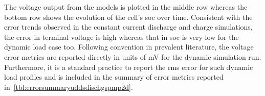 The  voltage  output from  the  models  is plotted  in  the  middle row  whereas
the  bottom  row  shows  the  evolution  of  the  cell's  \gls{soc}  over  time.
Consistent with the error trends observed  in the constant current discharge and
charge  simulations, the  error  in terminal  voltage is  high  whereas that  in
\gls{soc} is  very low for  the dynamic load  case too. Following  convention in
prevalent  literature,  the  voltage  error metrics  are  reported  directly  in
units  of  \si{\milli\volt} for  the  dynamic  simulation run.  Furthermore,  it
is  a  standard  practice  to  report  the  \gls{rms}  error  for  such  dynamic
load  profiles  and  is  included  in the  summary  of  error  metrics  reported
in~\cref{tbl:errorsummaryuddsdischgspmp2d}.




